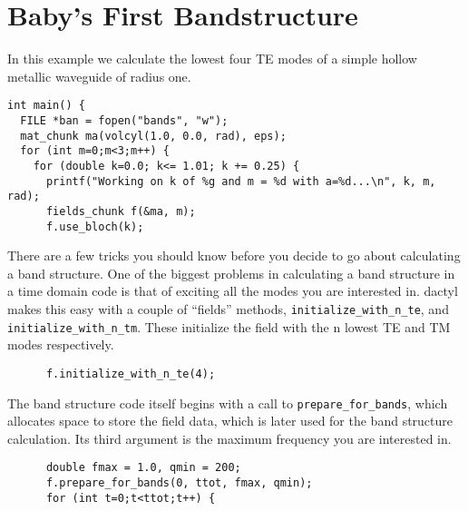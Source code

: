 \begin{comment}
/*
\end{comment}
\section{Baby's First Bandstructure}
\begin{comment}
*/
\end{comment}

\begin{comment}
#include <stdio.h>
#include <stdlib.h>
#include "dactyl.h"

double eps(const vec &) {
  return 1.0;
}
const int rad = 10;
const int ttot = 1500*rad;
\end{comment}

In this example we calculate the lowest four TE modes of a simple hollow
metallic waveguide of radius one.

\begin{verbatim}
int main() {
  FILE *ban = fopen("bands", "w");
  mat_chunk ma(volcyl(1.0, 0.0, rad), eps);
  for (int m=0;m<3;m++) {
    for (double k=0.0; k<= 1.01; k += 0.25) {
      printf("Working on k of %g and m = %d with a=%d...\n", k, m, rad);
      fields_chunk f(&ma, m);
      f.use_bloch(k);
\end{verbatim}

There are a few tricks you should know before you decide to go about
calculating a band structure.  One of the biggest problems in calculating a
band structure in a time domain code is that of exciting all the modes you
are interested in.  dactyl makes this easy with a couple of ``fields''
methods, \verb-initialize_with_n_te-, and \verb-initialize_with_n_tm-.
These initialize the field with the n lowest TE and TM modes respectively.

\begin{verbatim}
      f.initialize_with_n_te(4);
\end{verbatim}

The band structure code itself begins with a call to
\verb-prepare_for_bands-, which allocates space to store the field
data, which is later used for the band structure calculation.  Its third
argument is the maximum frequency you are interested in.

\begin{verbatim}
      double fmax = 1.0, qmin = 200;
      f.prepare_for_bands(0, ttot, fmax, qmin);
      for (int t=0;t<ttot;t++) {
\end{verbatim}

